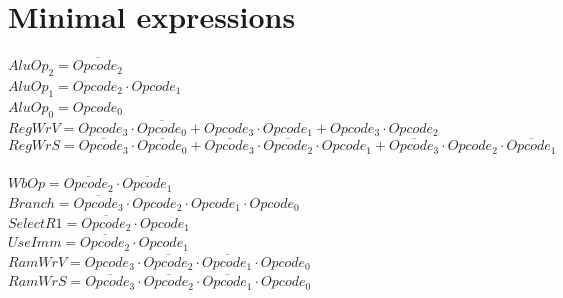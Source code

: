 \documentclass [15pt,a4paper,twoside]{article}
\begin{document}
\section{Minimal expressions}
$AluOp_{2} =  \overline{Opcode_{2}} $~\\
$AluOp_{1} = Opcode_{2} \cdot Opcode_{1}$~\\
$AluOp_{0} = Opcode_{0}$~\\
$RegWrV = Opcode_{3} \cdot  \overline{Opcode_{0}} +Opcode_{3} \cdot Opcode_{1}+Opcode_{3} \cdot Opcode_{2}$~\\
$RegWrS =  \overline{Opcode_{3}}  \cdot  \overline{Opcode_{0}} + \overline{Opcode_{3}}  \cdot  \overline{Opcode_{2}}  \cdot Opcode_{1}+ \overline{Opcode_{3}}  \cdot Opcode_{2} \cdot  \overline{Opcode_{1}} $~\\
$WbOp =  \overline{Opcode_{2}}  \cdot  \overline{Opcode_{1}} $~\\
$Branch =  \overline{Opcode_{3}}  \cdot Opcode_{2} \cdot Opcode_{1} \cdot Opcode_{0}$~\\
$SelectR1 =  \overline{Opcode_{2}}  \cdot Opcode_{1}$~\\
$UseImm =  \overline{Opcode_{2}}  \cdot Opcode_{1}$~\\
$RamWrV = Opcode_{3} \cdot  \overline{Opcode_{2}}  \cdot  \overline{Opcode_{1}}  \cdot Opcode_{0}$~\\
$RamWrS =  \overline{Opcode_{3}}  \cdot  \overline{Opcode_{2}}  \cdot  \overline{Opcode_{1}}  \cdot Opcode_{0}$~\\
\end{document}
